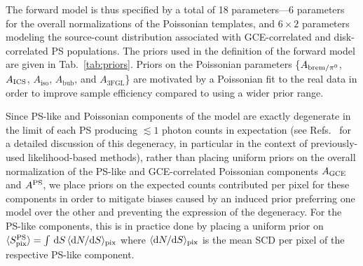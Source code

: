 \documentclass[prd,aps,10pt,nofootinbib,twocolumn,superscriptaddress,preprintnumbers,balancelastpage,longbibliography]{revtex4-1}
\begin{document}
The forward model is thus specified by a total of 18 parameters---6 parameters for the overall normalizations of the Poissonian templates, and $6\times2$ parameters modeling the source-count distribution associated with GCE-correlated and disk-correlated PS populations. The priors used in the definition of the forward model are given in Tab.~\ref{tab:priors}. Priors on the Poissonian parameters \{$A_{{\rm brem}/\pi^0}$, $A_{\rm ICS}$, $A_\text{iso}$, $A_\text{bub}$, and $A_\text{3FGL}$\} are motivated by a Poissonian fit to the real \Fermi data in order to improve sample efficiency compared to using a wider prior range. 

Since PS-like and Poissonian components of the model are exactly degenerate in the limit of each PS producing $\lesssim 1$ photon counts in expectation (see Refs.~\cite{Chang:2019ars,Collin:2021ufc} for a detailed discussion of this degeneracy, in particular in the context of previously-used likelihood-based methods), rather than placing uniform priors on the overall normalization of the PS-like and GCE-correlated Poissonian components $A_{\rm GCE}$ and $A^{\rm PS}$, we place priors on the expected counts contributed per pixel for these components in order to mitigate biases caused by an induced prior preferring one model over the other and preventing the expression of the degeneracy. For the PS-like components, this is in practice done by placing a uniform prior on $\langle S_{\rm pix}^{\rm PS} \rangle = \int\,\mathrm{d} S\,\langle \mathrm{d} N/\mathrm{d} S \rangle_{\rm pix}$ where $\langle \mathrm{d} N/\mathrm{d} S \rangle_{\rm pix}$ is the mean SCD per pixel of the respective PS-like component.
\end{document}

